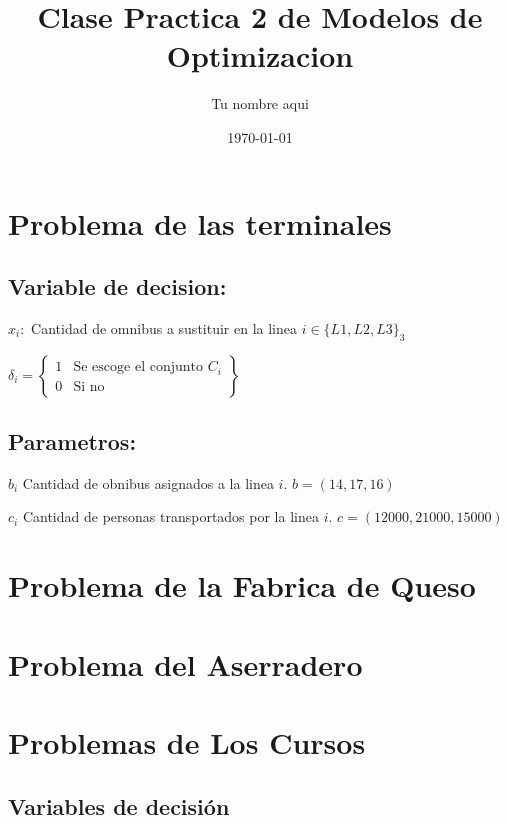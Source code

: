 \documentclass[]{article}
\begin{document}
\title{\bf Clase Practica 2 de Modelos de Optimizacion }          
\author{Tu nombre aqui}                        
\date{\today} 

\maketitle 


\section{Problema de las terminales }

\subsection{Variable de decision:}

$x_i:$ Cantidad de omnibus a sustituir en la  linea $i \in \{L1,L2,L3\}_3$ 

$
\delta_{i} = 
 \left\{ \begin{array}{cl}
 1 & \mbox{Se escoge el conjunto $C_i$}\\
 0 & \mbox{Si no}
 \end{array}\right\}
$


\subsection{Parametros:}

$b_i$ Cantidad de obnibus asignados a la linea $i$. $ b = \left(14,17,16\right) $  

$c_i$ Cantidad de personas transportados por la linea $i$. $c =\left(12000,21000, 15000\right)$ 

\section{Problema de la Fabrica de  Queso}

\section{Problema del Aserradero} 



\section{Problemas de Los Cursos} 

\subsection{Variables de decisi\'on}
\end{document}
